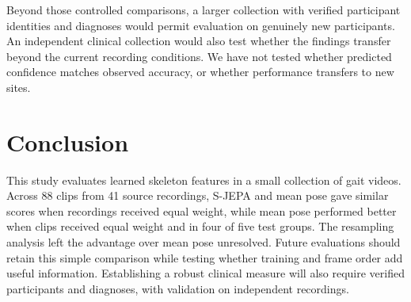 \documentclass[10pt,twocolumn,letterpaper]{article}
\begin{document}
Beyond those controlled comparisons, a larger collection with verified participant identities and diagnoses would permit evaluation on genuinely new participants. An independent clinical collection would also test whether the findings transfer beyond the current recording conditions. We have not tested whether predicted confidence matches observed accuracy, or whether performance transfers to new sites.

\section{Conclusion}
This study evaluates learned skeleton features in a small collection of gait videos. Across 88 clips from 41 source recordings, S-JEPA and mean pose gave similar scores when recordings received equal weight, while mean pose performed better when clips received equal weight and in four of five test groups. The resampling analysis left the advantage over mean pose unresolved. Future evaluations should retain this simple comparison while testing whether training and frame order add useful information. Establishing a robust clinical measure will also require verified participants and diagnoses, with validation on independent recordings.

{\small


}
\end{document}
